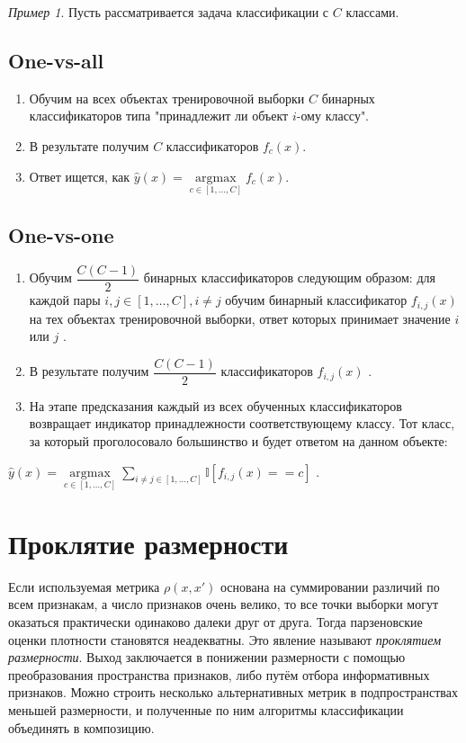\documentclass[a4paper, 12pt]{article}
\theoremstyle{plain} %
\theoremstyle{definition} %
\theoremstyle{remark} %
\newtheorem{example}{Пример}
\begin{document}
\begin{example}
Пусть рассматривается задача классификации с $ C $
 классами.

\subsection{One-vs-all}

\begin{enumerate}
	\item Обучим на всех объектах тренировочной выборки $ C $ бинарных классификаторов типа "принадлежит ли объект $ i $-ому классу".
	\item В результате получим $ C $ классификаторов $ f_c(x) $.
	\item Ответ ищется, как $ \hat y(x) = \underset{c \in [1, \dots, C] }{\operatorname{argmax}} f_c(x) $.
\end{enumerate}

\subsection{One-vs-one}

\begin{enumerate}
	\item Обучим $ \dfrac{C(C - 1)}{2} $
 бинарных классификаторов следующим образом: для каждой пары $ i, j \in [1, \dots, C], i \ne j $
 обучим бинарный классификатор $ f_{i, j}(x) $
 на тех объектах тренировочной выборки, ответ которых принимает значение $ i $
 или $ j $
.
	\item В результате получим $ \dfrac{C(C - 1)}{2} $
 классификаторов $ f_{i, j}(x) $
.
	\item На этапе предсказания каждый из всех обученных классификаторов возвращает индикатор принадлежности соответствующему классу. Тот класс, за который проголосовало большинство и будет ответом на данном объекте:
\end{enumerate}

$ \hat y(x) = \underset{c \in [1, \dots, C] }{\operatorname{argmax}} \sum \limits_{i \ne j \in [1, \dots, C]} \mathbb I [f_{i, j}(x) == c] $
.

\section{Проклятие размерности}

Если используемая метрика $\rho(x,x′)$ основана на суммировании различий по всем признакам, а число признаков очень велико, то все точки выборки могут оказаться практически одинаково далеки друг от друга. Тогда парзеновские оценки плотности становятся неадекватны. Это явление называют \emph{проклятием размерности}. Выход заключается в понижении размерности с помощью преобразования пространства признаков, либо путём отбора информативных признаков. Можно строить несколько альтернативных метрик в подпространствах меньшей размерности, и полученные по ним алгоритмы классификации объединять в композицию.


\end{example}
\end{document}
